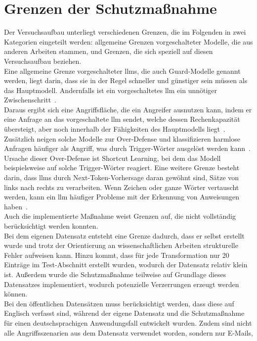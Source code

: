 \section{Grenzen der Schutzmaßnahme}\label{sec:grenzen_massnahme}

Der Versuchsaufbau unterliegt verschiedenen Grenzen, die im Folgenden in zwei Kategorien eingeteilt werden: allgemeine Grenzen vorgeschalteter Modelle, die aus
anderen Arbeiten stammen, und Grenzen, die sich speziell auf diesen Versuchsaufbau beziehen. \\
Eine allgemeine Grenze vorgeschalteter \acp{llm}, die auch Guard-Modelle genannt werden, liegt darin, dass sie in der Regel schneller und günstiger sein müssen als das Hauptmodell.
Andernfalls ist ein vorgeschaltetes \ac{llm} ein unnötiger Zwischenschritt~\cite[1]{sm36}. \\
Daraus ergibt sich eine Angriffsfläche, die ein Angreifer ausnutzen kann, indem er eine Anfrage an das vorgeschaltete \ac{llm} sendet, welche dessen Rechenkapazität übersteigt, aber noch 
innerhalb der Fähigkeiten des Hauptmodells liegt~\cite[2]{sm36}. Zusätzlich neigen solche Modelle zur Over-Defense und klassifizieren harmlose Anfragen häufiger
als Angriff, was durch Trigger-Wörter ausgelöst werden kann~\cite[1\psq]{sm37}. Ursache dieser Over-Defense ist Shortcut Learning, bei dem das Modell 
beispielsweise auf solche Trigger-Wörter reagiert. Eine weitere Grenze besteht darin, dass \acp{llm} durch Next-Token-Vorhersage daran gewöhnt sind, Sätze von links nach rechts zu verarbeiten.
Wenn Zeichen oder ganze Wörter vertauscht werden, kann ein \ac{llm} häufiger Probleme mit der Erkennung von Anweisungen haben~\cite[4]{sm38}. \\
Auch die implementierte Maßnahme weist Grenzen auf, die nicht vollständig berücksichtigt werden konnten. \\
Bei dem eigenen Datensatz entsteht eine Grenze dadurch, dass er selbst erstellt wurde und trotz der Orientierung an wissenschaftlichen Arbeiten strukturelle Fehler
aufweisen kann. Hinzu kommt, dass für jede Transformation nur 20 Einträge im Test-Abschnitt erstellt wurden, wodurch der Datensatz relativ klein ist. Außerdem wurde die Schutzmaßnahme
teilweise auf Grundlage dieses Datensatzes implementiert, wodurch potenzielle Verzerrungen erzeugt werden können. \\
Bei den öffentlichen Datensätzen muss berücksichtigt werden, dass diese auf Englisch verfasst sind, während der eigene Datensatz und die Schutzmaßnahme
für einen deutschsprachigen Anwendungsfall entwickelt wurden. Zudem sind nicht alle Angriffsszenarien aus dem Datensatz verwendet worden, sondern nur E-Mails, 
